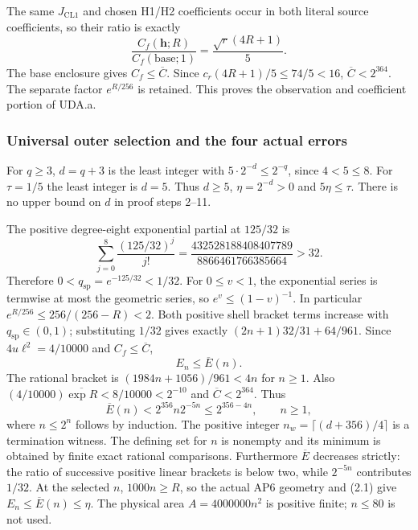 The same $J_{\mathrm{CL1}}$ and chosen H1/H2 coefficients occur in both
literal source coefficients, so their ratio is exactly
\[
 \frac{C_f(\mathbf h;R)}{C_f(\mathrm{base};1)}
 =\frac{\sqrt r(4R+1)}5.
\]
The base enclosure gives $C_f\le\overline C$. Since
$c_r(4R+1)/5\le74/5<16$, $\overline C<2^{364}$.
The separate factor $e^{R/256}$ is retained. This proves the observation
and coefficient portion of UDA.a.

\subsubsection{Universal outer selection and the four actual errors}
For $q\ge3$, $d=q+3$ is the least integer with
$5\cdot2^{-d}\le2^{-q}$, since $4<5\le8$. For $\tau=1/5$ the least
integer is $d=5$. Thus $d\ge5$, $\eta=2^{-d}>0$ and $5\eta\le\tau$.
There is no upper bound on $d$ in proof steps 2--11.

The positive degree-eight exponential partial at $125/32$ is
\[
 \sum_{j=0}^8\frac{(125/32)^j}{j!}
 =\frac{432528188408407789}{8866461766385664}>32.
\]
Therefore $0<q_{\mathrm{sp}}=e^{-125/32}<1/32$.
For $0\le v<1$, the exponential series is termwise at most the geometric
series, so $e^v\le(1-v)^{-1}$. In particular
$e^{R/256}\le256/(256-R)<2$. Both positive shell bracket terms increase
with $q_{\mathrm{sp}}\in(0,1)$; substituting $1/32$ gives exactly
$(2n+1)32/31+64/961$. Since $4u\ell^2=4/10000$ and $C_f\le\overline C$,
\begin{equation}E_n\le\overline E(n).\tag{2.1}\end{equation}
The rational bracket is $(1984n+1056)/961<4n$ for $n\ge1$.
Also $(4/10000)\overline{\exp R}<8/10000<2^{-10}$ and
$\overline C<2^{364}$. Thus
\begin{equation}
 \overline E(n)<2^{356}n2^{-5n}\le2^{356-4n},\qquad n\ge1,\tag{2.2}
\end{equation}
where $n\le2^n$ follows by induction. The positive integer
$n_w=\lceil(d+356)/4\rceil$ is a termination witness. The defining set
for $n$ is nonempty and its minimum is obtained by finite exact rational
comparisons. Furthermore $\overline E$ decreases strictly: the ratio of
successive positive linear brackets is below two, while $2^{-5n}$
contributes $1/32$. At the selected $n$, $1000n\ge R$, so the actual AP6
geometry and (2.1) give $E_n\le\overline E(n)\le\eta$.
The physical area $A=4000000n^2$ is positive finite; $n\le80$ is not used.

